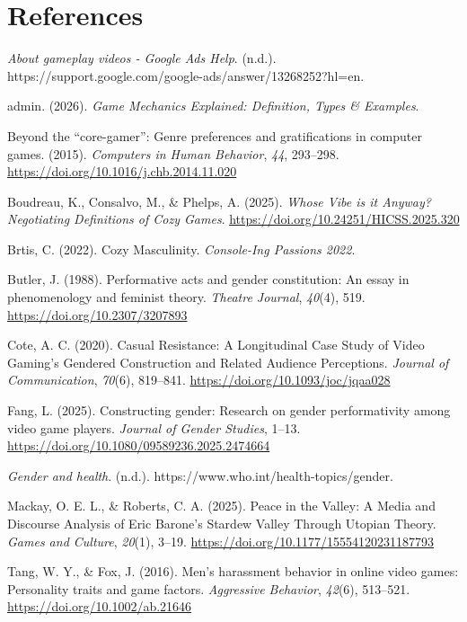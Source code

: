 \documentclass[
  12pt,
  letterpaper,
  DIV=11,
  numbers=noendperiod]{scrreprt}
\newlength{\cslhangindent}
\newenvironment{CSLReferences}[2] %
 {\begin{list}{}{%
  \setlength{\itemindent}{0pt}
  \setlength{\leftmargin}{0pt}
  \setlength{\parsep}{0pt}
  \ifodd #1
   \setlength{\leftmargin}{\cslhangindent}
   \setlength{\itemindent}{-1\cslhangindent}
  \fi
  \setlength{\itemsep}{#2\baselineskip}}}
 {\end{list}}
\begin{document}

\chapter{References}\label{references}

\protect{}\label{refs}
\begin{CSLReferences}{1}{0}
\emph{About gameplay videos - {Google Ads Help}}. (n.d.).
https://support.google.com/google-ads/answer/13268252?hl=en.

{admin}. (2026). \emph{Game {Mechanics Explained}: {Definition}, {Types}
\& {Examples}}.

Beyond the {``core-gamer''}: {Genre} preferences and gratifications in
computer games. (2015). \emph{Computers in Human Behavior}, \emph{44},
293--298. \url{https://doi.org/10.1016/j.chb.2014.11.020}

Boudreau, K., Consalvo, M., \& Phelps, A. (2025). \emph{Whose {Vibe} is
it {Anyway}? {Negotiating Definitions} of {Cozy Games}}.
\url{https://doi.org/10.24251/HICSS.2025.320}

Brtis, C. (2022). Cozy {Masculinity}. \emph{Console-Ing Passions 2022}.

Butler, J. (1988). Performative acts and gender constitution: An essay
in phenomenology and feminist theory. \emph{Theatre Journal},
\emph{40}(4), 519. \url{https://doi.org/10.2307/3207893}

Cote, A. C. (2020). Casual {Resistance}: {A Longitudinal Case Study} of
{Video Gaming}'s {Gendered Construction} and {Related Audience
Perceptions}. \emph{Journal of Communication}, \emph{70}(6), 819--841.
\url{https://doi.org/10.1093/joc/jqaa028}

Fang, L. (2025). Constructing gender: Research on gender performativity
among video game players. \emph{Journal of Gender Studies}, 1--13.
\url{https://doi.org/10.1080/09589236.2025.2474664}

\emph{Gender and health}. (n.d.).
https://www.who.int/health-topics/gender.

Mackay, O. E. L., \& Roberts, C. A. (2025). Peace in the {Valley}: {A
Media} and {Discourse Analysis} of {Eric Barone}'s {Stardew Valley
Through Utopian Theory}. \emph{Games and Culture}, \emph{20}(1), 3--19.
\url{https://doi.org/10.1177/15554120231187793}

Tang, W. Y., \& Fox, J. (2016). Men's harassment behavior in online
video games: {Personality} traits and game factors. \emph{Aggressive
Behavior}, \emph{42}(6), 513--521.
\url{https://doi.org/10.1002/ab.21646}

\end{CSLReferences}
\end{document}
